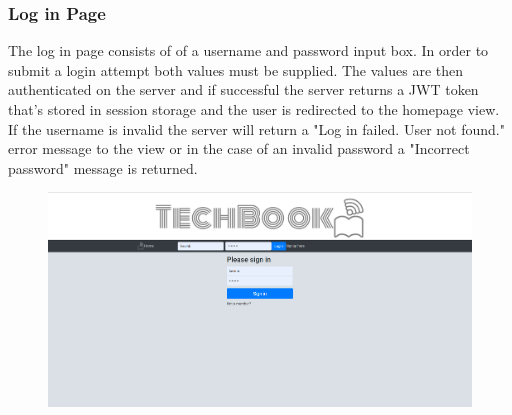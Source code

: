 \subsubsection{Log in Page}
The log in page consists of of a username and password input box. In order to submit a login attempt both values must be supplied. The values are then authenticated on the server and if successful the server returns a JWT token that's stored in session storage and the user is redirected to the homepage view.  If the username is invalid the server will return a "Log in failed. User not found." error message to the view or in the case of an invalid password a "Incorrect password" message is returned.
\begin{figure}[H]
\centering
\begin{minipage}{.75\textwidth}
  \centering
  \includegraphics[width=.9\linewidth]{img/ui/login_PC.PNG}
  \label{fig:loginPC}
\end{minipage}%
\begin{minipage}{.25\textwidth}
  \centering

\end{minipage}
\end{figure}
